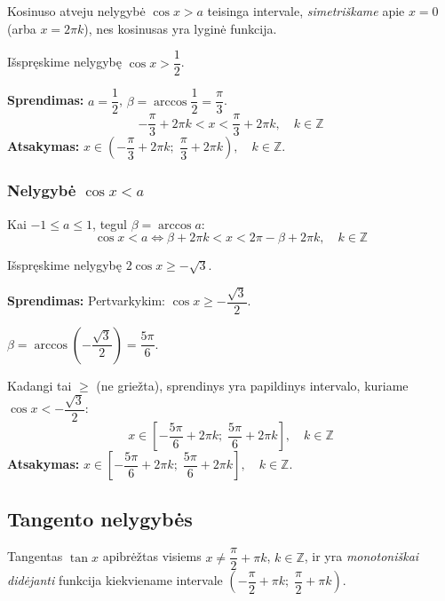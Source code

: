 \begin{remark}
Kosinuso atveju nelygybė $\cos x > a$ teisinga intervale, \emph{simetriškame} apie $x = 0$ (arba $x = 2\pi k$), nes kosinusas yra lyginė funkcija.
\end{remark}

\begin{example}
Išspręskime nelygybę $\cos x > \dfrac{1}{2}$.

\textbf{Sprendimas:} $a = \dfrac{1}{2}$, $\beta = \arccos \dfrac{1}{2} = \dfrac{\pi}{3}$.
\[
-\frac{\pi}{3} + 2\pi k < x < \frac{\pi}{3} + 2\pi k, \quad k \in \mathbb{Z}
\]
\textbf{Atsakymas:} $x \in \left(-\dfrac{\pi}{3} + 2\pi k;\; \dfrac{\pi}{3} + 2\pi k\right), \quad k \in \mathbb{Z}$.
\end{example}

\subsubsection*{Nelygybė \texorpdfstring{$\cos x < a$}{cos x < a}}

\begin{tcolorbox}[colback=red!5!white, colframe=red!60!black, title=Formulė -- $\cos x < a$]
Kai $-1 \leq a \leq 1$, tegul $\beta = \arccos a$:
\[
\cos x < a \iff \beta + 2\pi k < x < 2\pi - \beta + 2\pi k, \quad k \in \mathbb{Z}
\]
\end{tcolorbox}

\begin{example}
Išspręskime nelygybę $2\cos x \geq -\sqrt{3}$.

\textbf{Sprendimas:} Pertvarkykim: $\cos x \geq -\dfrac{\sqrt{3}}{2}$.

$\beta = \arccos\!\left(-\dfrac{\sqrt{3}}{2}\right) = \dfrac{5\pi}{6}$.

Kadangi tai $\geq$ (ne griežta), sprendinys yra papildinys intervalo, kuriame $\cos x < -\dfrac{\sqrt{3}}{2}$:
\[
x \in \left[-\frac{5\pi}{6} + 2\pi k;\; \frac{5\pi}{6} + 2\pi k\right], \quad k \in \mathbb{Z}
\]
\textbf{Atsakymas:} $x \in \left[-\dfrac{5\pi}{6} + 2\pi k;\; \dfrac{5\pi}{6} + 2\pi k\right], \quad k \in \mathbb{Z}$.
\end{example}

\subsection{Tangento nelygybės}

Tangentas $\tan x$ apibrėžtas visiems $x \neq \dfrac{\pi}{2} + \pi k$, $k \in \mathbb{Z}$, ir yra \emph{monotoniškai didėjanti} funkcija kiekviename intervale $\left(-\dfrac{\pi}{2} + \pi k;\; \dfrac{\pi}{2} + \pi k\right)$.

